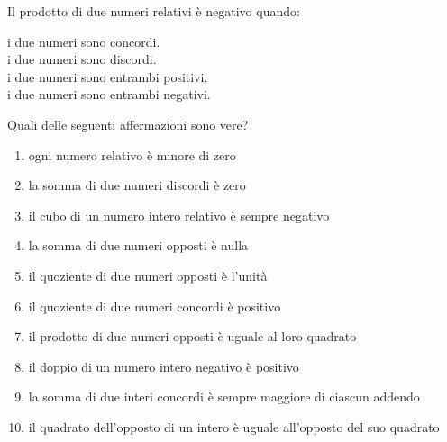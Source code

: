 \begin{esercizio}
Il prodotto di due numeri relativi è negativo quando:
 \begin{multicols}{2}
 \noindent
  \quad i due numeri sono concordi.\\
  \quad i due numeri sono discordi.\\
  \quad i due numeri sono entrambi positivi.\\
  \quad i due numeri sono entrambi negativi.
 \end{multicols}
\end{esercizio}

\pagebreak %

\begin{esercizio}
Quali delle seguenti affermazioni sono vere?
\TabPositions{12cm}
\begin{enumerate}[noitemsep, label=(\alph*)]
 \item ogni numero relativo è minore di zero \tab\verofalso
 \item la somma di due numeri discordi è zero \tab\verofalso
 \item il cubo di un numero intero relativo è sempre negativo 
\tab\verofalso
 \item la somma di due numeri opposti è nulla \tab\verofalso
 \item il quoziente di due numeri opposti è l'unità \tab\verofalso
 \item il quoziente di due numeri concordi è positivo \tab\verofalso
 \item il prodotto di due numeri opposti è uguale al loro quadrato 
\tab\verofalso
 \item il doppio di un numero intero negativo è positivo \tab\verofalso
 \item la somma di due interi concordi è sempre maggiore di ciascun addendo 
\tab\verofalso
 \item il quadrato dell'opposto di un intero è uguale all'opposto del suo 
quadrato \tab\verofalso
\end{enumerate}
\end{esercizio}


